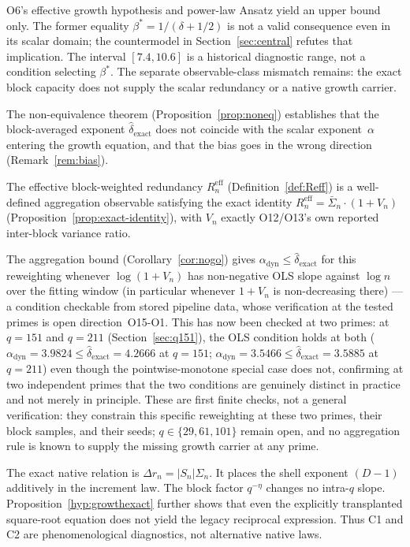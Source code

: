 \documentclass[11pt,a4paper]{article}
\newcommand{\Sn}{\bar{\Sigma}_n}
\newcommand{\dexact}{\hat{\delta}_{\mathrm{exact}}}
\newcommand{\Reff}{R_n^{\mathrm{eff}}}
\newcommand{\bstar}{\beta^{*}}
\begin{document}
O6's effective growth hypothesis and power-law Ansatz yield an upper bound only.
The former equality $\bstar=1/(\delta+1/2)$ is not a valid consequence even in its scalar domain;
the countermodel in Section~\ref{sec:central} refutes that implication.
The interval $[7.4,10.6]$ is a historical diagnostic range, not a condition selecting $\bstar$.
The separate observable-class mismatch remains: the exact block capacity does not supply the
scalar redundancy or a native growth carrier.

The non-equivalence theorem (Proposition~\ref{prop:noneq})
establishes that the block-averaged exponent $\dexact$ does not
coincide with the scalar exponent~$\alpha$ entering the growth
equation, and that the bias goes in the wrong direction
(Remark~\ref{rem:bias}).

The effective block-weighted redundancy $\Reff$
(Definition~\ref{def:Reff}) is a well-defined aggregation observable
satisfying the exact identity $\Reff=\Sn\cdot(1+V_n)$
(Proposition~\ref{prop:exact-identity}), with $V_n$ exactly O12/O13's own
reported inter-block variance ratio.

The aggregation bound (Corollary~\ref{cor:nogo}) gives
$\alpha_{\mathrm{dyn}}\leq\dexact$ for this reweighting whenever
$\log(1+V_n)$ has non-negative OLS slope against $\log n$ over the fitting
window (in particular whenever $1+V_n$ is non-decreasing there) — a
condition checkable from stored pipeline data, whose verification at the
tested primes is open direction~O15-O1.
This has now been checked at two primes: at $q=151$ and $q=211$
(Section~\ref{sec:q151}), the OLS condition holds at both
($\alpha_{\mathrm{dyn}}=3.9824\leq\dexact=4.2666$ at $q=151$;
$\alpha_{\mathrm{dyn}}=3.5466\leq\dexact=3.5885$ at $q=211$) even though the
pointwise-monotone special case does not, confirming at two independent
primes that the two conditions are genuinely distinct in practice and not
merely in principle.
These are first finite checks, not a general verification: they constrain
this specific reweighting at these two primes, their block samples, and
their seeds; $q\in\{29,61,101\}$ remain open, and no aggregation rule is
known to supply the missing growth carrier at any prime.

The exact native relation is $\Delta r_n=|S_n|\Sigma_n$.
It places the shell exponent $(D-1)$ additively in the increment law.
The block factor $q^{-\eta}$ changes no intra-$q$ slope.
Proposition~\ref{hyp:growthexact} further shows that even the explicitly transplanted
square-root equation does not yield the legacy reciprocal expression.
Thus C1 and C2 are phenomenological diagnostics, not alternative native laws.
\end{document}
